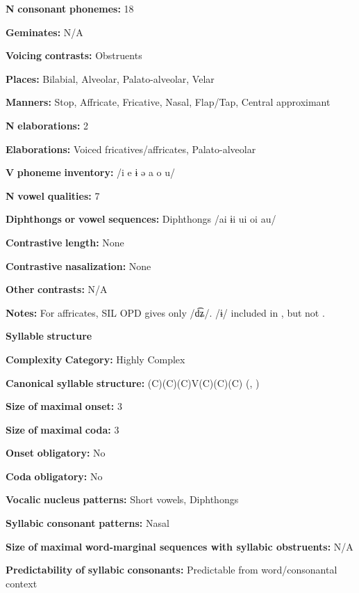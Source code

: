 \textbf{N} \textbf{consonant} \textbf{phonemes:} 18

\textbf{Geminates:} N/A

\textbf{Voicing} \textbf{contrasts:} Obstruents

\textbf{Places:} Bilabial, Alveolar, Palato-alveolar, Velar

\textbf{Manners:} Stop, Affricate, Fricative, Nasal, Flap/Tap, Central approximant

\textbf{N} \textbf{elaborations:} 2

\textbf{Elaborations:} Voiced fricatives/affricates, Palato-alveolar

\textbf{V} \textbf{phoneme} \textbf{inventory:} /i e ɨ ə a o u/

\textbf{N} \textbf{vowel} \textbf{qualities:} 7

\textbf{Diphthongs} \textbf{or} \textbf{vowel} \textbf{sequences:} Diphthongs /ai ɨi ui oi au/

\textbf{Contrastive} \textbf{length:} None

\textbf{Contrastive} \textbf{nasalization:} None

\textbf{Other} \textbf{contrasts:} N/A

\textbf{Notes:} For affricates, SIL OPD gives only /d͡ʑ/. /ɨ/ included in \citet{Bruce1984}, but not \citet{EdmistonEdmiston2003}.

\textbf{Syllable} \textbf{structure}

\textbf{Complexity} \textbf{Category:} Highly Complex

\textbf{Canonical} \textbf{syllable} \textbf{structure:} (C)(C)(C)V(C)(C)(C) (\citealt{Bruce1984}, \citealt{EdmistonEdmiston2003})

\textbf{Size} \textbf{of} \textbf{maximal} \textbf{onset:} 3

\textbf{Size} \textbf{of} \textbf{maximal} \textbf{coda:} 3

\textbf{Onset} \textbf{obligatory:} No

\textbf{Coda} \textbf{obligatory:} No

\textbf{Vocalic} \textbf{nucleus} \textbf{patterns:} Short vowels, Diphthongs

\textbf{Syllabic} \textbf{consonant} \textbf{patterns:} Nasal

\textbf{Size} \textbf{of} \textbf{maximal} \textbf{word{}-marginal sequences with syllabic obstruents:} N/A

\textbf{Predictability} \textbf{of} \textbf{syllabic} \textbf{consonants:} Predictable from word/consonantal context

